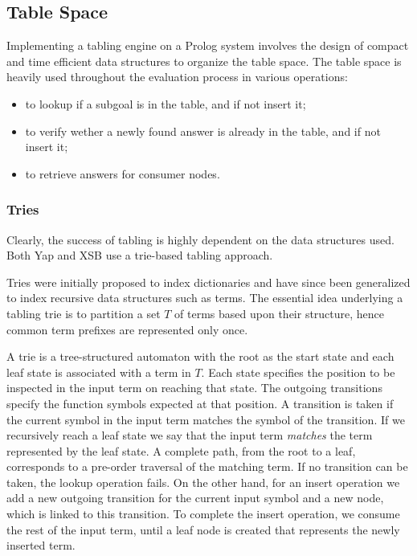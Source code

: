 \subsection{Table Space} \label{sec:table_space}
  
  Implementing a tabling engine on a Prolog system involves the design of compact and time efficient data structures
  to organize the table space. The table space is heavily used throughout the evaluation process in various operations:
  
  \begin{itemize}
    \item to lookup if a subgoal is in the table, and if not insert it;
    \item to verify wether a newly found answer is already in the table, and if not insert it;
    \item to retrieve answers for consumer nodes.
  \end{itemize}
  
  \subsubsection{Tries}
  
  Clearly, the success of tabling is highly dependent on the data structures used.
  Both Yap \cite{Rocha-03c} and XSB \cite{RamakrishnanIV-95} use a trie-based tabling approach.
  
  Tries were initially proposed to index dictionaries \cite{Fredkin-62} and have since been generalized to index recursive data structures
  such as terms. The essential idea underlying a tabling trie is to partition a set $T$ of terms based upon their structure,
  hence common term prefixes are represented only once.
  
  A trie is a tree-structured automaton with the root as the start state and each leaf state is associated with a term in $T$.
  Each state specifies the position to be inspected in the input term on reaching that state.
  The outgoing transitions specify the function symbols expected at that position.
  A transition is taken if the current symbol in the input term matches the symbol of the transition.
  If we recursively reach a leaf state we say that the input term \textit{matches} the term represented by the leaf state.
  A complete path, from the root to a leaf, corresponds to a pre-order traversal of the matching term.
  If no transition can be taken, the lookup operation fails. On the other hand, for an insert operation
  we add a new outgoing transition for the current input symbol and a new node, which is linked to this transition.
  To complete the insert operation, we consume the rest of the input term, until a leaf node is created that represents
  the newly inserted term.
  
